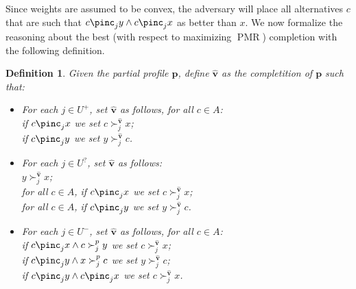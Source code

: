 \documentclass[12pt]{article}
\newcommand{\pref}{\succ}%
\newcommand{\ppref}{\succ^\text{p}}%
\newcommand{\profile}{\textbf{v}}%
\newcommand{\pprofile}{\textbf{p}}%
\newcommand{\w}{\textbf{w}}%
\DeclareMathOperator{\PMR}{PMR}
\newtheorem{definition}{Definition}
\begin{document}
Since weights are assumed to be convex, the adversary will place all alternatives $c$ that are such that $c \pinc_{j} y \wedge c \pinc_{j} x$ as better than $x$.
We now formalize the reasoning about the best (with respect to maximizing $\PMR$) completion with the following definition.
\begin{definition}
Given the partial profile $\pprofile$, define $\hat{\profile}$ as the completition of $\pprofile$ such that:
\begin{itemize}
\item For each $j \in U^{+}$, set   $\hat{\profile}$ as follows, for all $c \in A$:\\
if $c \pinc_{j} x$ we set $c \succ_{j}^{\hat{\profile}} x$;\\
if  $c \pinc_{j} y$ we set $y \succ_{j}^{\hat{\profile}} c$.
\item For each $j \in U^{?}$, set  $\hat{\profile}$ as follows:\\
$y \succ_{j}^{\hat{\profile}} x$;\\
for all $c \in A$, if   $c \pinc_{j} x$ we set $c \succ_{j}^{\hat{\profile}} x$;\\
for all $c \in A$, if   $c \pinc_{j} y$ we set $y \succ_{j}^{\hat{\profile}} c$.
\item For each $j \in U^{-}$,  set  $\hat{\profile}$ as follows, for all $c \in A$:\\
if $c \pinc_{j} x \wedge c \succ^{p}_{j} y$ we set $c \succ_{j}^{\hat{\profile}} x$;\\
if $c \pinc_{j} y \wedge  x \succ^{p}_{j} c$ we set $y \succ_{j}^{\hat{\profile}} c$;\\
if $c \pinc_{j} y \wedge c \pinc_{j} x$ we set $c \succ_{j}^{\hat{\profile}} x$.
\end{itemize}
\end{definition}


\end{document}
